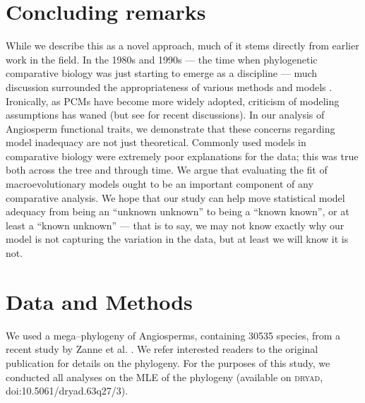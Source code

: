 \documentclass[a4paper,12pt]{article}
\begin{document}
\section{Concluding remarks}
While we describe this as a novel approach, much of it stems directly from earlier work in the field. In the 1980s and 1990s --- the time when phylogenetic comparative biology was just starting to emerge as a discipline --- much discussion surrounded the appropriateness of various methods and models \citep{Felsenstein1985, Felsenstein1988, HarveyPagel1991, Garland1992, Pagel1993, Diaz1996, Price1997, Garland1999, GarlandIves2000}. Ironically, as PCMs have become more widely adopted, criticism of modeling assumptions has waned (but see \citep{Felsenstein2012, Hansen2012} for recent discussions). In our analysis of Angiosperm functional traits, we demonstrate that these concerns regarding model inadequacy are not just theoretical. Commonly used models in comparative biology were extremely poor explanations for the data; this was true both across the tree and through time. We argue that evaluating the fit of macroevolutionary models ought to be an important component of any comparative analysis. We hope that our study can help move statistical model adequacy from being an ``unknown unknown''  to being a ``known known'', or at least a ``known unknown'' --- that is to say, we may not know exactly why our model is not capturing the variation in the data, but at least we will know it is not.

\section{Data and Methods}

We used a mega--phylogeny of Angiosperms, containing 30535 species, from a recent study by Zanne et al. \citep{Zanne2013}. We refer interested readers to the original publication \citep{Zanne2013} for details on the phylogeny. For the purposes of this study, we conducted all analyses on the MLE of the phylogeny (available on \textsc{dryad}, doi:10.5061/dryad.63q27/3).
\end{document}
